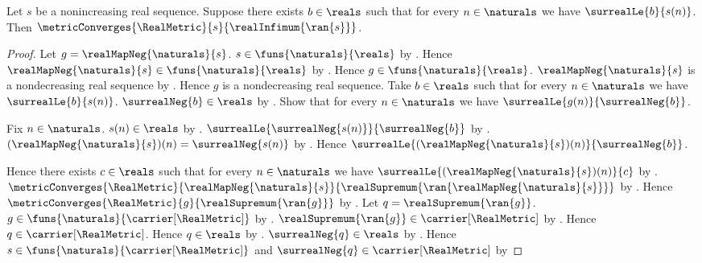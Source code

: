 \begin{theorem}\label{nonincreasing_real_sequence_converges_to_infimum}
    Let $s$ be a nonincreasing real sequence.
    Suppose there exists $b\in\reals$ such that for every
        $n\in\naturals$ we have $\surrealLe{b}{s(n)}$.
    Then $\metricConverges{\RealMetric}{s}{\realInfimum{\ran{s}}}$.
\end{theorem}
\begin{proof}
    Let $g=\realMapNeg{\naturals}{s}$.
    $s\in\funs{\naturals}{\reals}$ by
        .
    Hence $\realMapNeg{\naturals}{s}\in\funs{\naturals}{\reals}$ by
        .
    Hence $g\in\funs{\naturals}{\reals}$.
    $\realMapNeg{\naturals}{s}$ is a nondecreasing real sequence by
        .
    Hence $g$ is a nondecreasing real sequence.
    Take $b\in\reals$ such that for every $n\in\naturals$ we have
        $\surrealLe{b}{s(n)}$.
    $\surrealNeg{b}\in\reals$ by
        .
    Show that for every $n\in\naturals$ we have
        $\surrealLe{g(n)}{\surrealNeg{b}}$.
    \begin{subproof}
        Fix $n\in\naturals$.
        $s(n)\in\reals$ by .
        $\surrealLe{\surrealNeg{s(n)}}{\surrealNeg{b}}$ by
            .
        $(\realMapNeg{\naturals}{s})(n)=\surrealNeg{s(n)}$ by
            .
        Hence $\surrealLe{(\realMapNeg{\naturals}{s})(n)}
            {\surrealNeg{b}}$.
    \end{subproof}
    Hence there exists $c\in\reals$ such that for every
        $n\in\naturals$ we have
        $\surrealLe{(\realMapNeg{\naturals}{s})(n)}{c}$ by
        \auto.
    $\metricConverges{\RealMetric}{\realMapNeg{\naturals}{s}}
        {\realSupremum{\ran{\realMapNeg{\naturals}{s}}}}$ by
        .
    Hence $\metricConverges{\RealMetric}{g}
        {\realSupremum{\ran{g}}}$ by \auto.
    Let $q=\realSupremum{\ran{g}}$.
    $g\in\funs{\naturals}{\carrier[\RealMetric]}$ by
        .
    $\realSupremum{\ran{g}}\in\carrier[\RealMetric]$ by
        .
    Hence $q\in\carrier[\RealMetric]$.
    Hence $q\in\reals$ by .
    $\surrealNeg{q}\in\reals$ by
        .
    Hence $s\in\funs{\naturals}{\carrier[\RealMetric]}$ and
        $\surrealNeg{q}\in\carrier[\RealMetric]$ by

\end{proof}
